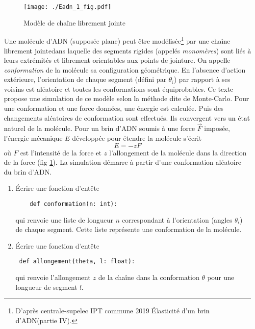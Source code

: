\begin{figure}[h]
 \centering
 \texttt{[image: ./Eadn\_1\_fig.pdf]}
 \caption{Modèle de chaîne librement jointe}
 \label{fig: adn_1}
\end{figure}
\noindent
Une molécule d'ADN (supposée plane) peut être modélisée\footnote{D'après centrale-supelec IPT commune 2019 \og\'Elasticité d'un brin d'ADN\fg (partie IV).} par une \og chaîne librement jointe\fg dans laquelle des segments rigides (appelés \emph{monomères}) sont liés à leurs extrémités et librement orientables aux points de jointure. On appelle \emph{conformation} de la molécule sa configuration géométrique. En l'absence d'action extérieure, l'orientation de chaque segment (défini par $\theta_i$) par rapport à ses voisins est aléatoire et toutes les conformations sont équiprobables.\newline
Ce texte propose une simulation de ce modèle selon la méthode dite de \og Monte-Carlo\fg. Pour une conformation et une force données, une énergie est calculée. Puis des changements aléatoires de conformation sont effectués. Ils convergent vers un état naturel de la molécule.\newline
Pour un brin d'ADN soumis à une force $\overrightarrow{F}$ imposée, l'énergie mécanique $E$ développée pour étendre la molécule s'écrit
\[
 E = - z F
\]
où $F$ est l'intensité de la force et $z$ l'allongement de la molécule dans la direction de la force (fig \ref{fig: adn_1}).\newline
La simulation démarre à partir d'une conformation aléatoire du brin d'ADN.
\begin{enumerate}
 \item \'Ecrire une fonction d'entête
\begin{verbatim}
    def conformation(n: int):
\end{verbatim}
qui renvoie une liste de longueur $n$ correspondant à l'orientation (angles $\theta_i$) de chaque segment. Cette liste représente une conformation de la molécule.
  \item \'Ecrire une fonction d'entête
\begin{verbatim}
 def allongement(theta, l: float):
\end{verbatim}
qui renvoie l'allongement $z$ de la chaîne dans la conformation $\theta$ pour une longueur de segment $l$.
\end{enumerate}


